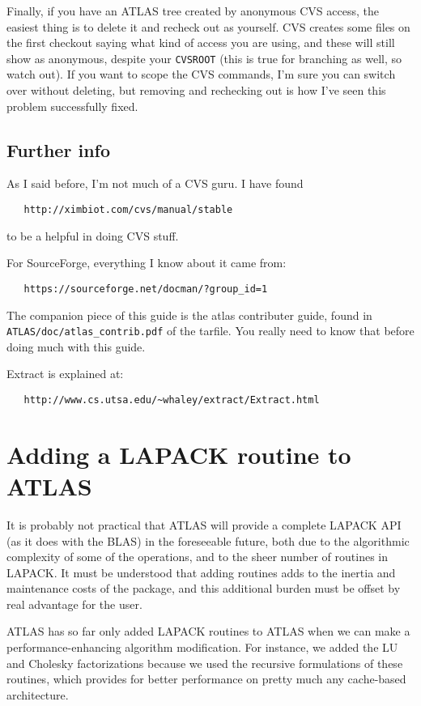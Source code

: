 \documentclass[11pt]{article}
\begin{document}
{Finally, if you have an ATLAS tree created by anonymous CVS access, the
easiest thing is to delete it and recheck out as yourself.  CVS creates
some files on the first checkout saying what kind of access you are using,
and these will still show as anonymous, despite your {\tt CVSROOT} (this is
true for branching as well, so watch out).  If you
want to scope the CVS commands, I'm sure you can switch over without deleting,
but removing and rechecking out is how I've seen this problem successfully
fixed.

\subsection{Further info}
As I said before, I'm not much of a CVS guru.  I have found 
\begin{verbatim}
   http://ximbiot.com/cvs/manual/stable
\end{verbatim}
to be a helpful in doing CVS stuff.

For SourceForge, everything I know about it came from:
\begin{verbatim}
   https://sourceforge.net/docman/?group_id=1
\end{verbatim}

The companion piece of this guide is the atlas contributer guide, found
in {\tt ATLAS/doc/atlas\_contrib.pdf} of the tarfile.  You really need to 
know that before doing much with this guide.

Extract is explained at:
\begin{verbatim}
   http://www.cs.utsa.edu/~whaley/extract/Extract.html
\end{verbatim}
}

\section{Adding a LAPACK routine to ATLAS}

It is probably not practical that ATLAS will provide a complete LAPACK
API (as it does with the BLAS) in the foreseeable future, both due to the
algorithmic complexity of some of the operations, and to the sheer number
of routines in LAPACK.  It must be understood that adding routines adds
to the inertia and maintenance costs of the package, and this additional
burden must be offset by real advantage for the user.

ATLAS has so far only added LAPACK routines to ATLAS when we can make a
performance-enhancing algorithm modification.  For instance, we added the
LU and Cholesky factorizations because we used the recursive formulations
of these routines, which provides for better performance on pretty much
any cache-based architecture.
\end{document}
